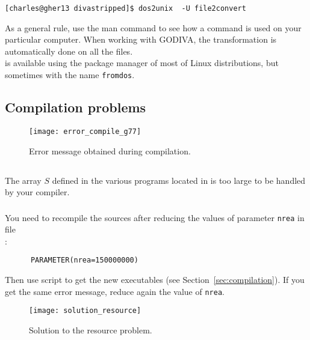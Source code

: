 \begin{lstlisting}[style=Bash]
[charles@gher13 divastripped]$ dos2unix  -U file2convert
\end{lstlisting}
As a general rule, use the man command to see how a command is used on your particular computer. 
When working with GODIVA, the transformation is automatically done on all the files. \\
 is available using the package manager of most of Linux distributions, but sometimes with the name \texttt{fromdos}.


\subsection{Compilation problems\label{sec:error_compile}}

\begin{figure}[htpb]
\centering
\texttt{[image: error\_compile\_g77]}
\caption{Error message obtained during compilation. \label{fig:error_compile}}
\end{figure}

\subsection{\question}

The array $S$ defined in the various programs located in  is too large to be handled by your compiler. 


\subsubsection{\answer}

You need to recompile the sources after reducing the values of parameter \texttt{nrea} in file\\
 :
\begin{verbatim}
      PARAMETER(nrea=150000000)
\end{verbatim}
Then use script  to get the new executables (see Section~\ref{sec:compilation}). If you get the same error message, reduce again the value of \texttt{nrea}.

\begin{figure}[htpb]
\centering
\texttt{[image: solution\_resource]}
\caption{Solution to the resource problem.}
\end{figure}


